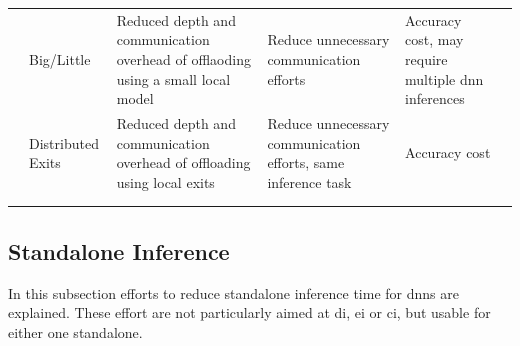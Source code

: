 {\begin{longtabu}{>{\bfseries}X|X[c]|X[c]|X[c]|X[c]|X[c]}
	& Big/Little & Reduced depth and communication overhead of offlaoding using a small local model & Reduce unnecessary communication efforts & Accuracy cost, may require multiple \gls{dnn} inferences & \cite{park_big/little_2015} \tabularnewline {}
	
	& Distributed Exits & Reduced depth and communication overhead of offloading using local exits  &  Reduce unnecessary communication efforts, same inference task & Accuracy cost & \cite{leroux_cascading_2017,teerapittayanon_distributed_2017, li_edge_2018} \tabularnewline {}
	
	& & & & & \tabularnewline {}
	
	& & & & & \tabularnewline 

	\bottomrule
\end{longtabu}}

\subsection{Standalone Inference}

In this subsection efforts to reduce standalone inference time for \gls{dnn}s are explained. These effort are not particularly aimed at \gls{di}, \gls{ei} or \gls{ci}, but usable for either one standalone. 

